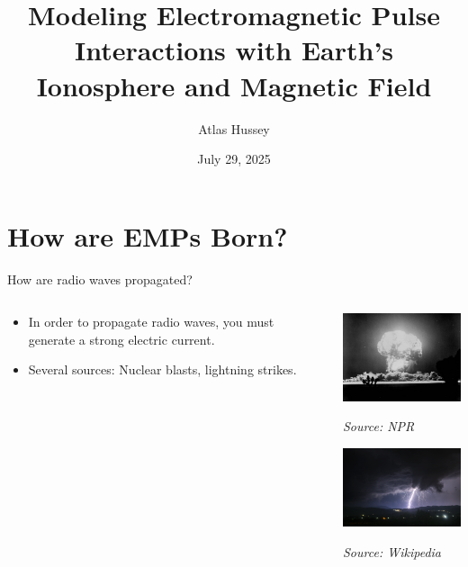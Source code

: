 \documentclass[10pt, aspectratio=168]{beamer}
\title [EMP Analysis]{Modeling Electromagnetic Pulse Interactions with Earth's Ionosphere and Magnetic Field}
\author{Atlas Hussey}
\institute[]{ Institute for Computing in Research \\ Santa Fe, NM}
\date[07/29/2025]
{July 29, 2025}
\begin{document}
\frame{\titlepage}

\section{How are EMPs Born?}
    \begin{frame}{How are radio waves propagated?}
    \begin{columns}
        \begin{column}{0.4\textwidth}
            \begin{itemize}
                \item \large{In order to propagate radio waves, you must generate a strong electric current. }
                \vspace{1cm}
                \item Several sources: Nuclear blasts, lightning strikes.
            \end{itemize}  
        \end{column}
        \begin{column}{0.4\textwidth}
             \includegraphics[width=5cm]{apple-2-nuke-test.jpg}
            \caption{\scriptsize{\textit{Source: NPR}}}
            \vspace{0.5cm}
             \includegraphics[width=5cm]{Rural_nightime_lightning_strike.png}
            \caption{\scriptsize{\textit{Source: Wikipedia}}}
        \end{column}
    \end{columns}
  
    \end{frame}
    
\end{document}
